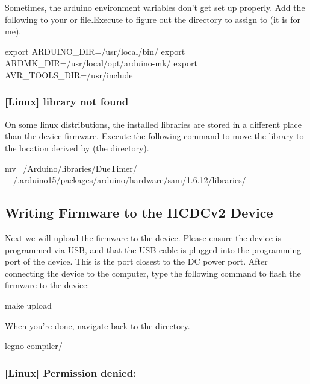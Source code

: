 Sometimes, the arduino environment variables don't get set up properly. Add the following to your  or  file.Execute  to figure out the directory to assign  to (it is  for me).

\begin{snippet}
export ARDUINO_DIR=/usr/local/bin/
export ARDMK_DIR=/usr/local/opt/arduino-mk/
export AVR_TOOLS_DIR=/usr/include
\end{snippet}

\subsubsection{[Linux]  library not found}

On some linux distributions, the installed libraries are stored in a different
place than the device firmware. Execute the following command to move the
 library to the location derived by  (the
 directory).

\begin{snippet}
  mv ~/Arduino/libraries/DueTimer/ \
      ~/.arduino15/packages/arduino/hardware/sam/1.6.12/libraries/
\end{snippet}

\subsection{Writing Firmware to the HCDCv2 Device}
Next we will upload the firmware to the
device. Please ensure the device is programmed via USB,
and that the USB cable is plugged into the programming port of the device.
This is the port closest to the DC power port. After connecting the device to the computer, type the following command to flash the firmware to the device:

\begin{snippet}
  make upload
\end{snippet}

When you're done, navigate back to the  directory.

\begin{snippet}
  legno-compiler/
\end{snippet}


\subsubsection{[Linux] Permission denied: }

